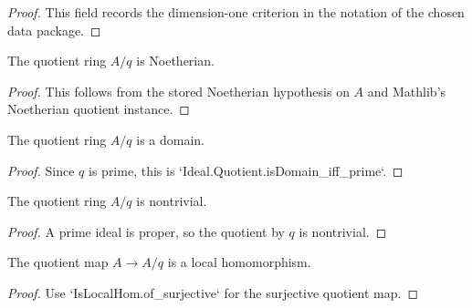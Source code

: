 \begin{proof}
  This field records the dimension-one criterion in the notation of the chosen
  data package.
\end{proof}

\begin{lemma}
  \label{lem:bad_quotient_source_data_quotient_is_noetherian}
  The quotient ring \(A/q\) is Noetherian.
\end{lemma}

\begin{proof}
  This follows from the stored Noetherian hypothesis on \(A\) and Mathlib's
  Noetherian quotient instance.
\end{proof}

\begin{lemma}
  \label{lem:bad_quotient_source_data_quotient_is_domain}
  The quotient ring \(A/q\) is a domain.
\end{lemma}

\begin{proof}
  Since \(q\) is prime, this is `Ideal.Quotient.isDomain_iff_prime`.
\end{proof}

\begin{lemma}
  \label{lem:bad_quotient_source_data_quotient_nontrivial}
  The quotient ring \(A/q\) is nontrivial.
\end{lemma}

\begin{proof}
  A prime ideal is proper, so the quotient by \(q\) is nontrivial.
\end{proof}

\begin{lemma}
  \label{lem:bad_quotient_source_data_quotient_mk_is_local_hom}
  The quotient map \(A\to A/q\) is a local homomorphism.
\end{lemma}

\begin{proof}
  Use `IsLocalHom.of_surjective` for the surjective quotient map.
\end{proof}

